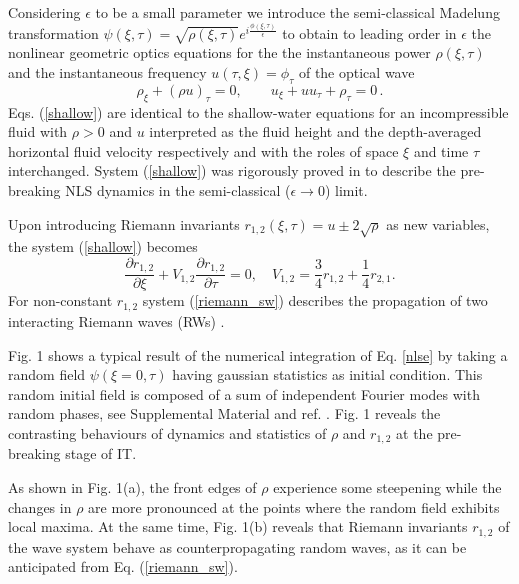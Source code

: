 \documentclass[twocolumn,preprintnumbers,amsmath,amssymb,superscriptaddress]{revtex4}
\begin{document}
Considering $\epsilon$ to be a small parameter we introduce the  semi-classical Madelung transformation
$\psi(\xi,\tau)=\sqrt{\rho(\xi,\tau)}e ^{i
  \frac{\phi(\xi,\tau)}{\epsilon}}$   to obtain to leading order in
$\epsilon$  the nonlinear geometric optics equations for the the instantaneous
power  $\rho(\xi,\tau)$  and  the  instantaneous frequency  $u(\tau,
\xi)= \phi_\tau$ of the optical wave
\cite{forest_exact_2009,Wabnitz:13b,Fatome:14,Kodama1995,Moro:14}
\begin{equation}\label{shallow}
    \rho_{\xi}+(\rho u)_{\tau}=0, \qquad u_{\xi}+uu_{\tau}+\rho_{\tau}
    =0 \, .
\end{equation}
Eqs. (\ref{shallow}) are identical to the shallow-water
equations for an incompressible fluid  with $\rho>0$ and $u$ interpreted as the
fluid height and  the depth-averaged horizontal fluid
velocity respectively and with the roles of space $\xi$ and
time $\tau$ interchanged. System (\ref{shallow}) was rigorously proved in \cite{jin:1999} to describe the pre-breaking
NLS dynamics in the semi-classical  ($\epsilon \to 0$) limit. 

Upon introducing Riemann invariants $r_{1,2}(\xi,\tau)=u \pm 2 \sqrt{\rho}$
as new variables, 
the system (\ref{shallow}) becomes \cite{el:2016}
\begin{equation}\label{riemann_sw}
\frac{\partial r_{1,2}}{\partial \xi} + V_{1,2} \frac{\partial
  r_{1,2}}{\partial \tau}=0, \quad V_{1,2} = \frac{3}{4} r_{1,2} + \frac{1}{4} r_{2,1}.
  \end{equation}
For non-constant $r_{1,2}$ system (\ref{riemann_sw}) describes 
the propagation of two interacting Riemann waves (RWs) \cite{whitham}. 

Fig. 1 shows a typical result of the numerical integration
of Eq. \ref{nlse} by taking  
a random field $\psi(\xi=0,\tau)$ having  gaussian statistics
as initial condition.  
This random initial field is composed of a 
sum of independent Fourier modes with random phases, see 
Supplemental Material and ref. \cite{Randoux:16b,Nazarenko}.
Fig. 1 reveals the contrasting behaviours of dynamics and statistics of $\rho$ and $r_{1,2}$ 
at the pre-breaking stage of IT.
 
As shown in Fig. 1(a), the front edges of $\rho$ experience 
some steepening while the changes in $\rho$ are more pronounced 
at the points where the random field exhibits local maxima. 
At the same time, Fig. 1(b) reveals that Riemann invariants 
$r_{1,2}$ of the wave system behave as counterpropagating 
random waves, as it can be anticipated from  Eq. (\ref{riemann_sw}). 
\end{document}
